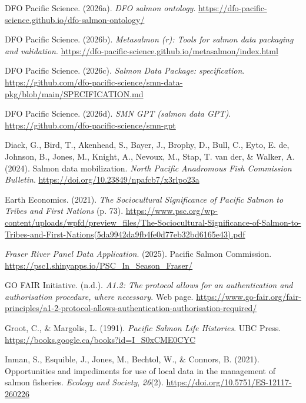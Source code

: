 \documentclass[
  letterpaper,
  DIV=11,
  numbers=noendperiod]{scrartcl}
\newlength{\cslhangindent}
\newenvironment{CSLReferences}[2] %
 {\begin{list}{}{%
  \setlength{\itemindent}{0pt}
  \setlength{\leftmargin}{0pt}
  \setlength{\parsep}{0pt}
  \ifodd #1
   \setlength{\leftmargin}{\cslhangindent}
   \setlength{\itemindent}{-1\cslhangindent}
  \fi
  \setlength{\itemsep}{#2\baselineskip}}}
 {\end{list}}
\begin{document}
\begin{CSLReferences}{1}{0}
DFO Pacific Science. (2026a). \emph{DFO salmon ontology}.
\url{https://dfo-pacific-science.github.io/dfo-salmon-ontology/}

DFO Pacific Science. (2026b). \emph{Metasalmon (r): Tools for salmon
data packaging and validation}.
\url{https://dfo-pacific-science.github.io/metasalmon/index.html}

DFO Pacific Science. (2026c). \emph{{Salmon Data Package}:
specification}.
\url{https://github.com/dfo-pacific-science/smn-data-pkg/blob/main/SPECIFICATION.md}

DFO Pacific Science. (2026d). \emph{SMN GPT (salmon data GPT)}.
\url{https://github.com/dfo-pacific-science/smn-gpt}

Diack, G., Bird, T., Akenhead, S., Bayer, J., Brophy, D., Bull, C.,
Eyto, E. de, Johnson, B., Jones, M., Knight, A., Nevoux, M., Stap, T.
van der, \& Walker, A. (2024). Salmon data mobilization. \emph{North
Pacific Anadromous Fish Commission Bulletin}.
\url{https://doi.org/10.23849/npafcb7/x3rlpo23a}

Earth Economics. (2021). \emph{The Sociocultural Significance of Pacific
Salmon to Tribes and First Nations} (p. 73).
\url{https://www.psc.org/wp-content/uploads/wpfd/preview_files/The-Sociocultural-Significance-of-Salmon-to-Tribes-and-First-Nations(5da9942da9fb4fe0d77eb32bd6165e43).pdf}

\emph{Fraser {River} {Panel} {Data} {Application}}. (2025). Pacific
Salmon Commission. \url{https://psc1.shinyapps.io/PSC_In_Season_Fraser/}

GO FAIR Initiative. (n.d.). \emph{A1.2: The protocol allows for an
authentication and authorisation procedure, where necessary}. Web page.
\url{https://www.go-fair.org/fair-principles/a1-2-protocol-allows-authentication-authorisation-required/}

Groot, C., \& Margolis, L. (1991). \emph{Pacific Salmon Life Histories}.
UBC Press. \url{https://books.google.ca/books?id=I_S0xCME0CYC}

Inman, S., Esquible, J., Jones, M., Bechtol, W., \& Connors, B. (2021).
Opportunities and impediments for use of local data in the management of
salmon fisheries. \emph{Ecology and Society}, \emph{26}(2).
\url{https://doi.org/10.5751/ES-12117-260226}


\end{CSLReferences}
\end{document}
